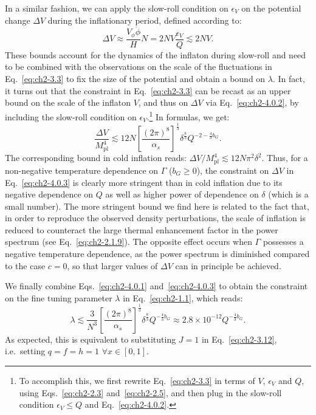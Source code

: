 In a similar fashion, we can apply the slow-roll condition on $\epsilon_V$ on the potential change $\Delta V$ during the inflationary period, defined according to:
\begin{equation}
    \Delta V \approx \frac{V_\phi \dot{\phi}}{H}N
     = 2N V\frac{\epsilon_V}{Q} \lesssim 2N V. \label{eq:ch2-4.0.2}
\end{equation}
These bounds account for the dynamics of the inflaton during slow-roll and need to be combined with the observations on the scale of the fluctuations in Eq.~\ref{eq:ch2-3.3} to fix the size of the potential and obtain a bound on $\lambda$. In fact, it turns out that the constraint in Eq.~\ref{eq:ch2-3.3} can be recast as an upper bound on the scale of the inflaton $V$, and thus on $\Delta V$ via Eq.~\ref{eq:ch2-4.0.2}, by including the slow-roll condition on $\epsilon_V$.\footnote{To accomplish this, we first rewrite Eq.~\ref{eq:ch2-3.3} in terms of $V$, $\epsilon_V$ and $Q$, using Eqs.~\ref{eq:ch2-2.3} and~\ref{eq:ch2-2.5}, and then plug in the slow-roll condition $\epsilon_V\leq Q$ and Eq.~\ref{eq:ch2-4.0.2}.} In formulas, we get:
\begin{equation}
    \frac{\Delta V}{M_{\mathrm{pl}}^4}\lesssim 12N\left[\frac{(2\pi)^8}{\alpha_s}\right]^{\frac{1}{3}}\delta^{\frac{8}{3}}Q^{-2-\frac{4}{3}b_G}. \label{eq:ch2-4.0.3}
\end{equation}
The corresponding bound in cold inflation reads: $\Delta V/M_{\mathrm{pl}}^4\lesssim 12 N\pi^2\delta^2 $. Thus, for a non-negative temperature dependence on $\Gamma$ ($b_G\geq 0$), the constraint on $\Delta V$ in Eq.~\ref{eq:ch2-4.0.3} is clearly more stringent than in cold inflation due to its negative dependence on $Q$ as well as higher power of dependence on $\delta$ (which is a small number). The more stringent bound we find here is related to the fact that, in order to reproduce the observed density perturbations, the scale of inflation is reduced to counteract the large thermal enhancement factor in the power spectrum (see Eq.~\ref{eq:ch2-2.1.9}). The opposite effect occurs when $\Gamma$ possesses a negative temperature dependence, as the power spectrum is diminished compared to the case $c=0$, so that larger values of $\Delta V$ can in principle be achieved.

We finally combine Eqs.~\ref{eq:ch2-4.0.1} and~\ref{eq:ch2-4.0.3} to obtain the constraint on the fine tuning parameter $\lambda$ in Eq.~\ref{eq:ch2-1.1}, which reads:
\begin{equation}
    \lambda\lesssim \frac{3}{N^3}\left[\frac{(2\pi)^8}{\alpha_s}\right]^{\frac{1}{3}}\delta^{\frac{8}{3}}Q^{-\frac{4}{3}b_G}\approx 2.8\times 10^{-12} Q^{-\frac{4}{3}b_G}. \label{eq:ch2-4.0.4}
\end{equation}
As expected, this is equivalent to substituting $J=1$ in Eq.~\ref{eq:ch2-3.12}, i.e.\ setting $q=f=h=1$ $\forall x \in [0,1]$.

